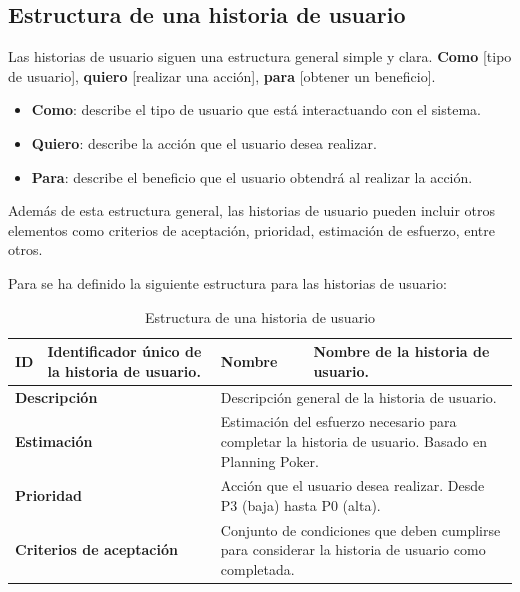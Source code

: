 \subsection{Estructura de una historia de usuario}

Las historias de usuario siguen una estructura general simple y clara. 
\newline\newline
\textbf{Como} [tipo de usuario], \textbf{quiero} [realizar una acción], \textbf{para} [obtener un beneficio].

\begin{itemize}
    \item \textbf{Como}: describe el tipo de usuario que está interactuando con el sistema.
    \item \textbf{Quiero}: describe la acción que el usuario desea realizar.
    \item \textbf{Para}: describe el beneficio que el usuario obtendrá al realizar la acción.   
\end{itemize}

Además de esta estructura general, las historias de usuario pueden incluir otros elementos como criterios de aceptación,
prioridad, estimación de esfuerzo, entre otros.

Para se ha definido la siguiente estructura para las historias de usuario:

\begin{table}[H]
    \centering
    \begin{tabular}{|p{2cm}|p{4cm}|p{2cm}|p{4cm}|}
        \hline
        \textbf{ID} & Identificador único de la historia de usuario. & \textbf{Nombre} & Nombre de la historia de usuario. \\
        \hline
        \multicolumn{2}{|p{6cm}|}{\textbf{Descripción}} & \multicolumn{2}{p{6cm}|}{Descripción general de la historia de usuario.} \\
        \hline
        \multicolumn{2}{|p{6cm}|}{\textbf{Estimación}} & \multicolumn{2}{p{6cm}|}{Estimación del esfuerzo necesario para completar la historia de usuario. Basado en Planning Poker.} \\
        \hline
        \multicolumn{2}{|p{6cm}|}{\textbf{Prioridad}} & \multicolumn{2}{p{6cm}|}{Acción que el usuario desea realizar. Desde P3 (baja) hasta P0 (alta).} \\
        \hline
        \multicolumn{2}{|p{6cm}|}{\textbf{Criterios de aceptación}} & \multicolumn{2}{p{6cm}|}{Conjunto de condiciones que deben cumplirse para considerar la historia de usuario como completada.} \\
        \hline
    \end{tabular}
    \caption{Estructura de una historia de usuario}
    \label{tab:estructura_historia_usuario}
\end{table}

